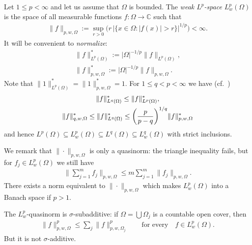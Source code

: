 \documentclass[11pt]{article}
\numberwithin{equation}{section}
\numberwithin{equation}{section}
\def\si{\sigma}
\def\Om{\Omega}
\def\C{\mathbb{C}}
\begin{document}
Let $1 \le p < \infty$ and let us assume that $\Om$ is bounded.
The \emph{weak $L^p$-space} $L_w^p(\Om)$ is the space of all measurable functions $f \colon \Om \to \C$ such that
\begin{gather*}
\|f\|_{p,w,\Om} := \sup_{r> 0} \big( r\, |\{x \in \Om \colon |f(x)| > r\}|^{1/p} \big) < \infty.
\end{gather*}
It will be convenient to \emph{normalize}:
\begin{gather*}
 \|f\|^*_{L^p(\Om)} := |\Om|^{-1/p} \|f\|_{L^p(\Om)},\\
 \|f\|^*_{p,w,\Om} := |\Om|^{-1/p} \|f\|_{p,w,\Om}.
\end{gather*}
Note that $\|1\|^*_{L^p(\Om)} = \|1\|^*_{p,w,\Om} =1$.
For $1 \le q < p < \infty$ we have (cf.\ \cite[Exercise\ 1.1.11]{Grafakos08})
\begin{gather}
 \|f\|^*_{L^q(\Om)} \le \|f\|^*_{L^p(\Om)}, \notag \\
 \|f\|^*_{q,w,\Om} \le \|f\|^*_{L^q(\Om)} \le \bigg(\frac{p}{p-q}\bigg)^{1/q}
 \|f\|^*_{p,w,\Om} \label{eq:qp}
\end{gather}
and hence
$L^p(\Om) \subseteq L_w^p(\Om) \subseteq L^q(\Om) \subseteq L_w^q(\Om)$
with strict inclusions.





We remark that $\|\cdot\|_{p,w,\Om}$ is only a quasinorm: the triangle inequality fails, but for
$f_j \in L_w^p(\Om)$
we still have
\begin{gather*}
\bigg\|\sum_{j=1}^m f_j \bigg\|_{p,w,\Om} \le m \sum_{j=1}^m \|f_j\|_{p,w,\Om}.
\end{gather*}
There exists a norm equivalent to $\|\cdot\|_{p,w,\Om}$ which makes $L_w^p(\Om)$ into a Banach space if $p>1$.

The $L^p_w$-quasinorm is $\si$-subadditive: if
$\Om = \bigcup \Om_j$ is a countable open cover, then
\begin{gather*}
 \|f\|^p_{p,w,\Om} \le \sum_j \|f\|^p_{p,w,\Om_j} \qquad \text{for every}\quad f \in L^p_w(\Om).
\end{gather*}
But it is not $\si$-additive.
\end{document}
